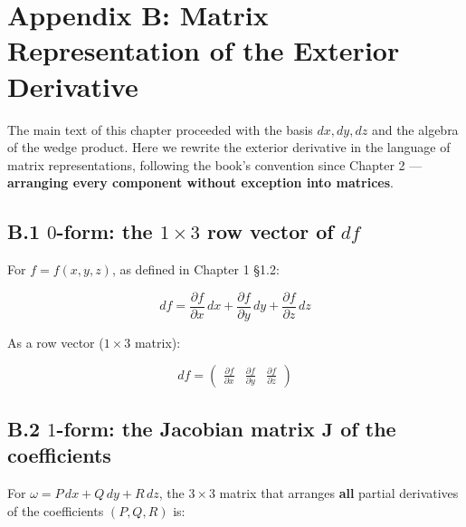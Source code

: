 \documentclass[a4paper,12pt,openany]{book}
\begin{document}
\par\vspace{0.35em}\par

\hypertarget{appendix-b-matrix-representation-of-the-exterior-derivative}{%
\section{Appendix B: Matrix Representation of the Exterior
Derivative}\label{appendix-b-matrix-representation-of-the-exterior-derivative}}

The main text of this chapter proceeded with the basis \(dx, dy, dz\)
and the algebra of the wedge product. Here we rewrite the exterior
derivative in the language of matrix representations, following the
book's convention since Chapter 2 —
\textbf{arranging every component without exception into matrices}.

\hypertarget{b.1-0-form-the-1-times-3-row-vector-of-df}{%
\subsection*{\texorpdfstring{B.1 \(0\)-form: the \(1 \times 3\) row
vector of
\(df\)}{B.1 0-form: the 1 \textbackslash times 3 row vector of df}}\label{b.1-0-form-the-1-times-3-row-vector-of-df}}

For \(f = f(x,y,z)\), as defined in Chapter 1 §1.2:

\[df = \frac{\partial f}{\partial x}\,dx + \frac{\partial f}{\partial y}\,dy + \frac{\partial f}{\partial z}\,dz\]

As a row vector (\(1 \times 3\) matrix):

\[df = \begin{pmatrix} \frac{\partial f}{\partial x} & \frac{\partial f}{\partial y} & \frac{\partial f}{\partial z} \end{pmatrix}\]

\hypertarget{b.2-1-form-the-jacobian-matrix-mathbfj-of-the-coefficients}{%
\subsection*{\texorpdfstring{B.2 \(1\)-form: the Jacobian matrix
\(\mathbf{J}\) of the
coefficients}{B.2 1-form: the Jacobian matrix \textbackslash mathbf\{J\} of the coefficients}}\label{b.2-1-form-the-jacobian-matrix-mathbfj-of-the-coefficients}}

For \(\omega = P\,dx + Q\,dy + R\,dz\), the \(3 \times 3\) matrix that
arranges \textbf{all} partial derivatives of the coefficients
\((P,Q,R)\) is:
\end{document}
